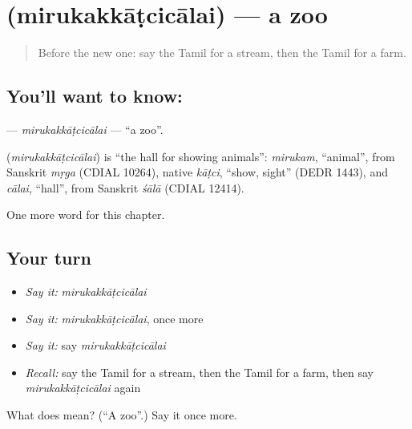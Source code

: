 \section[\texorpdfstring{\ta{மிருகக்காட்சிசாலை} (mirukakkāṭcicālai)}{மிருகக்காட்சிசாலை (mirukakkāṭcicālai)}]{ (mirukakkāṭcicālai) — a zoo}

\label{lesson:TA-C175-mirukakkatcicalai}



\begin{quote}
Before the new one: say the Tamil for a stream, then the Tamil for a farm.
\end{quote}

\subsection*{You'll want to know: }
\textbf{} — \emph{mirukakkāṭcicālai} — \textquotedblleft{}a zoo\textquotedblright{}.

\begin{cousinweb}
\textbf{} (\emph{mirukakkāṭcicālai}) is \textquotedblleft{}the hall for showing animals\textquotedblright{}: \emph{mirukam}, \textquotedblleft{}animal\textquotedblright{}, from Sanskrit \emph{mṛga} (CDIAL 10264), native \emph{kāṭci}, \textquotedblleft{}show, sight\textquotedblright{} (DEDR 1443), and \emph{cālai}, \textquotedblleft{}hall\textquotedblright{}, from Sanskrit \emph{śālā} (CDIAL 12414).
\end{cousinweb}

\begin{grammarlens}[title={What you've built}]
One more word for this chapter.
\end{grammarlens}

\subsection*{Your turn}
\begin{itemize}
\raggedright
  \item \emph{Say it:} \emph{mirukakkāṭcicālai}
  \item \emph{Say it:} \emph{mirukakkāṭcicālai}, once more
  \item \emph{Say it:} say \emph{mirukakkāṭcicālai}
  \item \emph{Recall:} say the Tamil for a stream, then the Tamil for a farm, then say \emph{mirukakkāṭcicālai} again
\end{itemize}

\begin{tcolorbox}[breakable,colback=teal!4,colframe=teal!35!black,title={Before you move on}]
What does  mean? (\textquotedblleft{}A zoo\textquotedblright{}.) Say it once more.
\end{tcolorbox}
